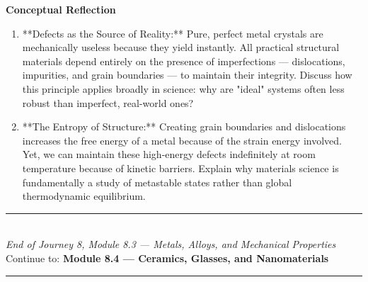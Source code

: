 \documentclass[12pt, a4paper]{book}
\begin{document}
\begin{reflectionbox}
\textbf{Conceptual Reflection}

\begin{enumerate}
  \item **Defects as the Source of Reality:** Pure, perfect metal crystals are mechanically useless because they yield instantly. All practical structural materials depend entirely on the presence of imperfections --- dislocations, impurities, and grain boundaries --- to maintain their integrity. Discuss how this principle applies broadly in science: why are "ideal" systems often less robust than imperfect, real-world ones?
  \item **The Entropy of Structure:** Creating grain boundaries and dislocations increases the free energy of a metal because of the strain energy involved. Yet, we can maintain these high-energy defects indefinitely at room temperature because of kinetic barriers. Explain why materials science is fundamentally a study of metastable states rather than global thermodynamic equilibrium.
\end{enumerate}
\end{reflectionbox}

\vspace{1.4cm}
\begin{center}
{\color{JourneyColor}\rule{0.5\linewidth}{0.8pt}}\\[6pt]
{\small\color{JourneyColor}\textit{End of Journey 8, Module 8.3 --- Metals, Alloys, and Mechanical Properties}}\\[4pt]
{\small\color{JourneyColor}Continue to: \textbf{Module 8.4 --- Ceramics, Glasses, and Nanomaterials}}\\[6pt]
{\color{JourneyColor}\rule{0.5\linewidth}{0.8pt}}
\end{center}
\end{document}
